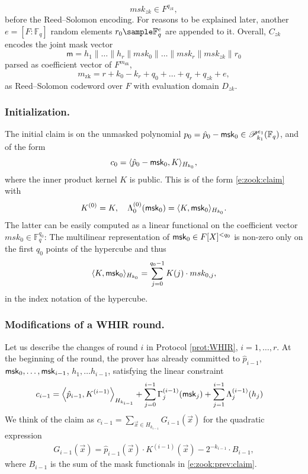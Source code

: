 \begin{equation}
\label{e:zook:mask:blinder:coeffs}
msk_{zk} \in F^{q_{zk}},
\end{equation}
before the Reed--Solomon encoding. 
For reasons to be explained later, another $e =[F:\mathbb F_q]$ random elements $r_0\sample \mathbb F_q^e$ are appended to it.
Overall, $C_{zk}$ encodes the joint mask vector  
\begin{equation}
\label{e:all:masks:concatenated}
\mathsf m = h_1\|\ldots \|h_r \| msk_0\| \ldots \| msk_r\| msk_{zk} \| r_0
\end{equation}
parsed as coefficient vector of $F^{m_\text{zk}}$,
\begin{equation}
\label{e:Czk:message:length}
m_\text{zk}= r + k_0 - k_r + q_0  + \ldots + q_r + q_{zk} + e,
\end{equation}
as Reed--Solomon codeword over $F$ with evaluation domain $D_{zk}$.


\subsubsection{Initialization.}
The initial claim is on the unmasked polynomial $p_0 = \hat p_0 - \mathsf{msk}_0 \in \mathscr P_{k_1}^{e_1}(\mathbb F_q)$, and of the form
\[
c_0 = \langle \hat p_0 - \mathsf{msk}_0, K \rangle_{H_{k_0}},
\]
where the inner product kernel $K$ is public.
This is of the form \eqref{e:zook:claim} with 
\[
K^{(0)} = K, \quad \Lambda_0^{(0)}(\mathsf{msk}_0) = \langle K, \mathsf{msk}_0\rangle_{H_{k_0}}.
\]
The latter can be easily computed as a linear functional on the coefficient vector $msk_0\in\mathbb F_q^{q_0}$:
The multilinear representation of $\mathsf{msk}_0\in F[X]^{< q_0}$ is non-zero only on the first $q_0$ points of the hypercube and thus
\[
\langle K, \mathsf{msk}_0\rangle_{H_{k_0}} = \sum_{j=0}^{q_0-1} K(j)\cdot msk_{0,j},
\]
in the index notation of the hypercube. 

\subsubsection{Modifications of a WHIR round.}

Let us describe the changes of round $i$ in Protocol \ref{prot:WHIR}, $i=1,\ldots, r$.
At the beginning of the round, the prover has already committed to 
$\hat p_{i-1}$, $\mathsf{msk}_0,\ldots, \mathsf{msk}_{i-1}$, $h_1,\ldots h_{i-1}$, satisfying the linear constraint
\begin{align}
\label{e:zook:prev:claim}
c_{i-1}  &= \left\langle \hat p_{i-1}, K^{(i-1)} \right\rangle_{H_{k_{i-1}}} 
 + \sum_{j=0}^{i-1} \Gamma_j^{(i-1)}(\mathsf{msk}_j)
+ \sum_{j=1}^{i-1} \Lambda_{j}^{(i-1)} (h_{j})
\end{align}
We think of the claim as $c_{i-1} = \sum_{\vec x\in H_{k_{i-1}}} G_{i-1}(\vec x)$ for the quadratic expression
\begin{align*}
G_{i-1}(\vec x) = \hat p_{i-1}(\vec x) \cdot K^{(i-1)}(\vec x) - 2^{-k_{i-1}}\cdot B_{i-1},
\end{align*}
where $B_{i-1}$ is the sum of the mask functionals in \eqref{e:zook:prev:claim}.


